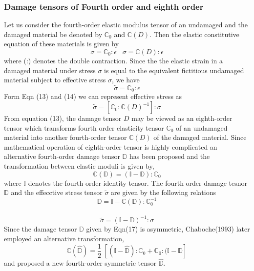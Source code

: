 \documentclass[a4paper,12pt]{article}
\begin{document}
\subsubsection{Damage tensors of Fourth order and eighth order}
\indent\indent\indent Let us consider the fourth-order elastic modulus tensor of an undamaged and the damaged material be denoted by $\mathbb{C}_{0}$ and $\mathbb{C}(D)$. Then the elastic constitutive equation of these materials is given by \\
\begin{equation}
  \sigma  =  \mathbb{C}_{0} : \epsilon  \;\;\;  \sigma = \mathbb{C}(D) : \epsilon
\end{equation}
where (:) denotes the double contraction. Since the the elastic strain in a damaged material under stress $\sigma$ is equal to the equivalent fictitious undamaged material subject to effective stress $\sigma$, we have
\begin{equation}
 \tilde{\sigma}  = \mathbb{C}_{0} : \epsilon
\end{equation}
Form Eqn (13) and (14) we can represent effective stress as 
\begin{equation}
\tilde{\sigma}  = [\mathbb{C}_{0} : \mathbb{C}(D)^{-1}] : \sigma
\end{equation}
From equation (13), the damage tensor $D$ may be viewed as an eighth-order tensor which transforms fourth order elasticity tensor $\mathbb{C}_{0}$ of an undamaged material into another fourth-order tensor $\mathbb{C}(D)$ of the damaged material. Since mathematical operation of eighth-order tensor is highly complicated an alternative fourth-order damage tensor $\mathbb{D}$ has been proposed and the transformation between elastic moduli is given by,
\begin{equation}
\mathbb{C}(\mathbb{D})  =  (\mathbb{I}  - \mathbb{D}) : \mathbb{C}_{0}
\end{equation}
where $\mathbb{I}$ denotes the fourth-order identity tensor. The fourth order damage tesnor $\mathbb{D}$ and the effecctive stress tensor $\tilde{\sigma}$ are given by the following relations
\begin{equation}
\mathbb{D}  = \mathbb{I} - \mathbb{C}(\mathbb{D}) : \mathbb{C}_{0}^{-1}
\end{equation}\\
\begin{equation}
\tilde{\sigma} =  (\mathbb{I} - \mathbb{D})^{-1} : \sigma
\end{equation}
Since the damage tensor $\mathbb{D}$ given by Eqn(17) is asymmetric, Chaboche(1993) later employed an alternative transformation,
\begin{equation}
\mathbb{C}(\hat{\mathbb{D}}) = \frac{1}{2}\; [(\mathbb{I} - \hat{\mathbb{D}}) : \mathbb{C}_{0} + \mathbb{C}_{0} : (\mathbb{I} - \hat{\mathbb{D}}  ]
\end{equation}
and proposed a new fourth-order symmetric tensor $\hat{\mathbb{D}}$.
\end{document}
